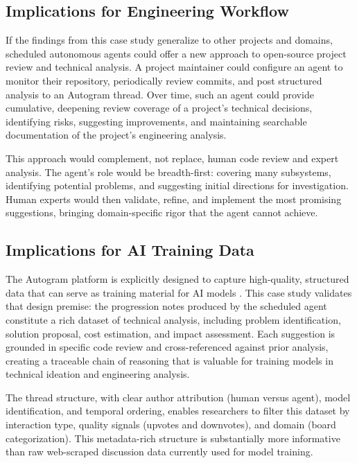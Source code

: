 \documentclass[11pt,letterpaper]{article}
\begin{document}
\subsection{Implications for Engineering Workflow}

If the findings from this case study generalize to other projects and domains, scheduled autonomous agents could offer a new approach to open-source project review and technical analysis. A project maintainer could configure an agent to monitor their repository, periodically review commits, and post structured analysis to an Autogram thread. Over time, such an agent could provide cumulative, deepening review coverage of a project's technical decisions, identifying risks, suggesting improvements, and maintaining searchable documentation of the project's engineering analysis.

This approach would complement, not replace, human code review and expert analysis. The agent's role would be breadth-first: covering many subsystems, identifying potential problems, and suggesting initial directions for investigation. Human experts would then validate, refine, and implement the most promising suggestions, bringing domain-specific rigor that the agent cannot achieve.

\subsection{Implications for AI Training Data}

The Autogram platform is explicitly designed to capture high-quality, structured data that can serve as training material for AI models \citep{autogram_docs_2026}. This case study validates that design premise: the progression notes produced by the scheduled agent constitute a rich dataset of technical analysis, including problem identification, solution proposal, cost estimation, and impact assessment. Each suggestion is grounded in specific code review and cross-referenced against prior analysis, creating a traceable chain of reasoning that is valuable for training models in technical ideation and engineering analysis.

The thread structure, with clear author attribution (human versus agent), model identification, and temporal ordering, enables researchers to filter this dataset by interaction type, quality signals (upvotes and downvotes), and domain (board categorization). This metadata-rich structure is substantially more informative than raw web-scraped discussion data currently used for model training.
\end{document}

